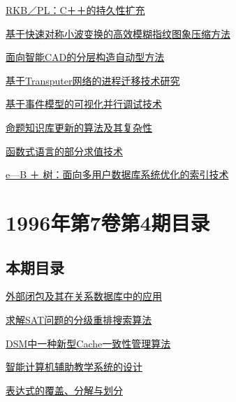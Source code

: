 \documentclass[a4paper]{article}
\begin{document}
\href{http://www.jos.org.cn/ch/reader/download_pdf.aspx?file_no=19960502&year_id=1996&quarter_id=5&falg=1}{RKB／PL：C＋＋的持久性扩充}

\href{http://www.jos.org.cn/ch/reader/download_pdf.aspx?file_no=19960503&year_id=1996&quarter_id=5&falg=1}{基于快速对称小波变换的高效模糊指纹图象压缩方法}

\href{http://www.jos.org.cn/ch/reader/download_pdf.aspx?file_no=19960504&year_id=1996&quarter_id=5&falg=1}{面向智能CAD的分层构造自动型方法}

\href{http://www.jos.org.cn/ch/reader/download_pdf.aspx?file_no=19960505&year_id=1996&quarter_id=5&falg=1}{基于Transputer网络的进程迁移技术研究}

\href{http://www.jos.org.cn/ch/reader/download_pdf.aspx?file_no=19960506&year_id=1996&quarter_id=5&falg=1}{基于事件模型的可视化并行调试技术}

\href{http://www.jos.org.cn/ch/reader/download_pdf.aspx?file_no=19960507&year_id=1996&quarter_id=5&falg=1}{命题知识库更新的算法及其复杂性}

\href{http://www.jos.org.cn/ch/reader/download_pdf.aspx?file_no=19960508&year_id=1996&quarter_id=5&falg=1}{函数式语言的部分求值技术}

\href{http://www.jos.org.cn/ch/reader/download_pdf.aspx?file_no=19960509&year_id=1996&quarter_id=5&falg=1}{e—B ＋ 树：面向多用户数据库系统优化的索引技术}


\section{\textbf{1996年第7卷第4期目录}}
\subsection{本期目录}
\href{http://www.jos.org.cn/ch/reader/download_pdf.aspx?file_no=19960401&year_id=1996&quarter_id=4&falg=1}{外部闭包及其在关系数据库中的应用}

\href{http://www.jos.org.cn/ch/reader/download_pdf.aspx?file_no=19960402&year_id=1996&quarter_id=4&falg=1}{求解SAT问题的分级重排搜索算法}

\href{http://www.jos.org.cn/ch/reader/download_pdf.aspx?file_no=19960403&year_id=1996&quarter_id=4&falg=1}{DSM中一种新型Cache一致性管理算法}

\href{http://www.jos.org.cn/ch/reader/download_pdf.aspx?file_no=19960404&year_id=1996&quarter_id=4&falg=1}{智能计算机辅助教学系统的设计}

\href{http://www.jos.org.cn/ch/reader/download_pdf.aspx?file_no=19960405&year_id=1996&quarter_id=4&falg=1}{表达式的覆盖、分解与划分}
\end{document}

